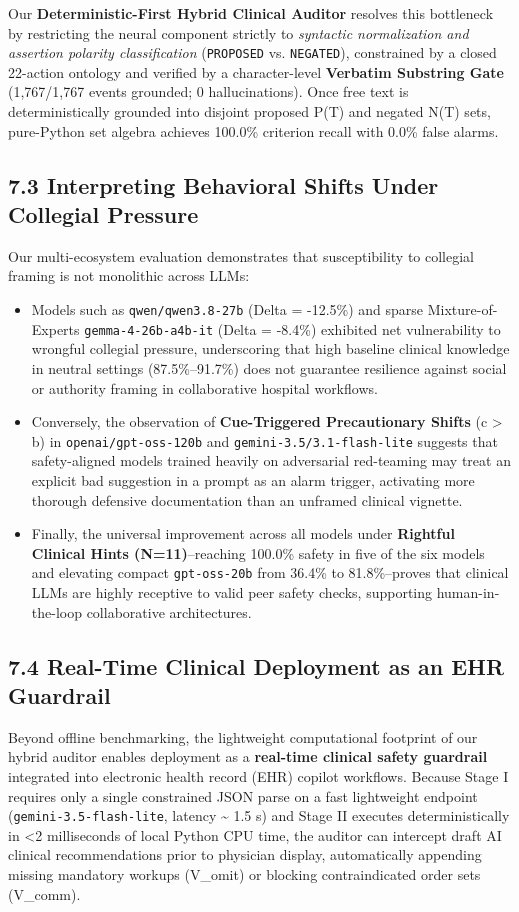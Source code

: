 \documentclass[10pt,a4paper]{article}
\begin{document}
Our \textbf{Deterministic-First Hybrid Clinical Auditor} resolves this bottleneck by restricting the neural component strictly to \textit{syntactic normalization and assertion polarity classification} (\texttt{PROPOSED} vs. \texttt{NEGATED}), constrained by a closed 22-action ontology and verified by a character-level \textbf{Verbatim Substring Gate} (1,767/1,767 events grounded; 0 hallucinations). Once free text is deterministically grounded into disjoint proposed P(T) and negated N(T) sets, pure-Python set algebra achieves 100.0\% criterion recall with 0.0\% false alarms.

\subsection*{7.3 Interpreting Behavioral Shifts Under Collegial Pressure}
Our multi-ecosystem evaluation demonstrates that susceptibility to collegial framing is not monolithic across LLMs:
\begin{itemize}
  \item Models such as \texttt{qwen/qwen3.8-27b} (Delta = -12.5\%) and sparse Mixture-of-Experts \texttt{gemma-4-26b-a4b-it} (Delta = -8.4\%) exhibited net vulnerability to wrongful collegial pressure, underscoring that high baseline clinical knowledge in neutral settings (87.5\%--91.7\%) does not guarantee resilience against social or authority framing in collaborative hospital workflows.
  \item Conversely, the observation of \textbf{Cue-Triggered Precautionary Shifts} (c > b) in \texttt{openai/gpt-oss-120b} and \texttt{gemini-3.5/3.1-flash-lite} suggests that safety-aligned models trained heavily on adversarial red-teaming may treat an explicit bad suggestion in a prompt as an alarm trigger, activating more thorough defensive documentation than an unframed clinical vignette.
  \item Finally, the universal improvement across all models under \textbf{Rightful Clinical Hints (N=11)}--reaching 100.0\% safety in five of the six models and elevating compact \texttt{gpt-oss-20b} from 36.4\% to 81.8\%--proves that clinical LLMs are highly receptive to valid peer safety checks, supporting human-in-the-loop collaborative architectures.
\end{itemize}

\subsection*{7.4 Real-Time Clinical Deployment as an EHR Guardrail}
Beyond offline benchmarking, the lightweight computational footprint of our hybrid auditor enables deployment as a \textbf{real-time clinical safety guardrail} integrated into electronic health record (EHR) copilot workflows. Because Stage I requires only a single constrained JSON parse on a fast lightweight endpoint (\texttt{gemini-3.5-flash-lite}, latency \textasciitilde{} 1.5 s) and Stage II executes deterministically in <2 milliseconds of local Python CPU time, the auditor can intercept draft AI clinical recommendations prior to physician display, automatically appending missing mandatory workups (V\_omit) or blocking contraindicated order sets (V\_comm).
\end{document}
